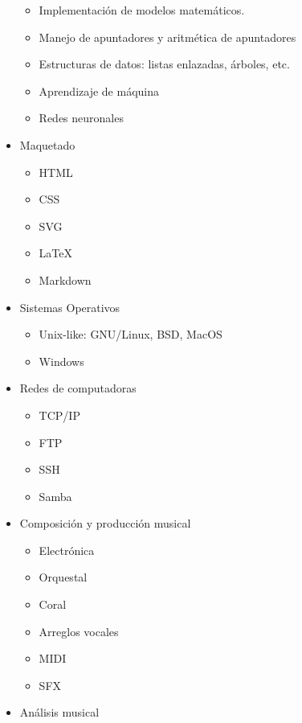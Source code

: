 \documentclass[11pt,letterpaper]{article}
\begin{document}
\begin{multicols}{2}
\begin{itemize}[leftmargin=*]
\begin{itemize}
        \item Implementación de modelos matemáticos.
        \item Manejo de apuntadores y aritmética de apuntadores
        \item Estructuras de datos: listas enlazadas, árboles, etc.
        \item Aprendizaje de máquina
        \item Redes neuronales
    \end{itemize}
    \item \colorbox{vinotinto}{\color{white}Maquetado}
    \begin{itemize}
        \item HTML
        \item CSS
        \item SVG
        \item LaTeX
        \item Markdown
    \end{itemize}
    \item \colorbox{vinotinto}{\color{white}Sistemas Operativos}
    \begin{itemize}
        \item Unix-like: GNU/Linux, BSD, MacOS
        \item Windows
    \end{itemize}
    \item \colorbox{vinotinto}{\color{white}Redes de computadoras}
    \begin{itemize}
        \item TCP/IP
        \item FTP
        \item SSH
        \item Samba
    \end{itemize}
    \item \colorbox{vinotinto}{\color{white}Composición y producción musical}
    \begin{itemize}
        \item Electrónica
        \item Orquestal
        \item Coral
        \item Arreglos vocales
        \item MIDI
        \item SFX
    \end{itemize}
    \item \colorbox{vinotinto}{\color{white}Análisis musical}
    \begin{itemize}

\end{itemize}
\end{itemize}
\end{multicols}
\end{document}
